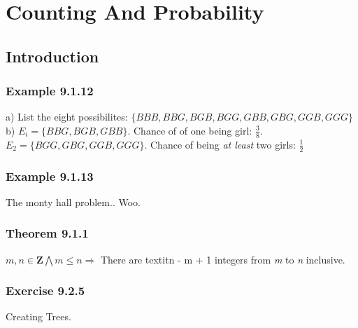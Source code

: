 \documentclass{article}
\begin{document}
\setcounter{section}{8}
\section{Counting And Probability}
\subsection{Introduction}

\subsubsection*{Example 9.1.12}
a) List the eight possibilites: $\{ BBB, BBG, BGB, BGG, GBB, GBG, GGB, GGG \}$
b) $E_i = \{ BBG, BGB, GBB \}$. Chance of of one being girl: $\frac{3}{8}$. \\
$E_2 = \{ BGG, GBG, GGB, GGG \} $. Chance of being \textit{at least} two girls: $\frac{1}{2}$


\subsubsection*{Example 9.1.13}
The monty hall problem.. Woo.

\subsubsection*{Theorem 9.1.1}
$m, n \in \mathbf{Z} \bigwedge m \leq n \Rightarrow$ There are
textit{n - m + 1} integers from \textit{m} to \textit{n} inclusive.

\subsubsection*{Exercise 9.2.5}
Creating Trees.
\end{document}
